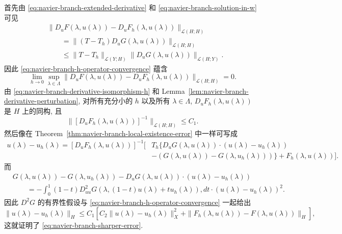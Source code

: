 \begin{Proof}
首先由 \eqref{eq:navier-branch-extended-derivative} 和
\eqref{eq:navier-branch-solution-in-w} 可见
\begin{align*}
&\|D_uF(\lambda,u(\lambda))-D_uF_h(\lambda,u(\lambda))\|_{\mathcal L(H;H)}\\
&\qquad=
\|(T-T_h)D_uG(\lambda,u(\lambda))\|_{\mathcal L(H;H)}\\
&\qquad\leq
\|T-T_h\|_{\mathcal L(Y;H)}
\|D_uG(\lambda,u(\lambda))\|_{\mathcal L(H;Y)}.
\end{align*}
因此 \eqref{eq:navier-branch-h-operator-convergence} 蕴含
\[
\lim_{h\to0}\sup_{\lambda\in\Lambda}
\|D_uF(\lambda,u(\lambda))-D_uF_h(\lambda,u(\lambda))\|_{\mathcal L(H;H)}=0.
\]
由 \eqref{eq:navier-branch-derivative-isomorphism-h} 和
Lemma~\ref{lem:navier-branch-derivative-perturbation}, 对所有充分小的 $h$
以及所有 $\lambda\in\Lambda$, $D_uF_h(\lambda,u(\lambda))$ 是 $H$ 上的同构, 且
\[
\|[D_uF_h(\lambda,u(\lambda))]^{-1}\|_{\mathcal L(H;H)}\leq C_1.
\]
然后像在 Theorem~\ref{thm:navier-branch-local-existence-error} 中一样可写成
\begin{align*}
u(\lambda)-u_h(\lambda)
=[D_uF_h(\lambda,u(\lambda))]^{-1}\big[&T_h\{D_uG(\lambda,u(\lambda))
\cdot(u(\lambda)-u_h(\lambda))\\
&-(G(\lambda,u(\lambda))-G(\lambda,u_h(\lambda)))\}
+F_h(\lambda,u(\lambda))\big].
\end{align*}
而
\begin{equation}\label{eq:navier-branch-taylor-remainder}
\begin{aligned}
&G(\lambda,u(\lambda))-G(\lambda,u_h(\lambda))
-D_uG(\lambda,u(\lambda))\cdot(u(\lambda)-u_h(\lambda))\\
&\qquad=-\int_0^1(1-t)D_{uu}^2G
(\lambda,(1-t)u(\lambda)+tu_h(\lambda)),dt
\cdot(u(\lambda)-u_h(\lambda))^2.
\end{aligned}
\end{equation}
因此 $D^2G$ 的有界性假设与
\eqref{eq:navier-branch-h-operator-convergence} 一起给出
\[
\|u(\lambda)-u_h(\lambda)\|_H
\leq C_1\left[
C_2\|u(\lambda)-u_h(\lambda)\|_X^2
+\|F_h(\lambda,u(\lambda))-F(\lambda,u(\lambda))\|_H
\right],
\]
这就证明了 \eqref{eq:navier-branch-sharper-error}.
\end{Proof}
